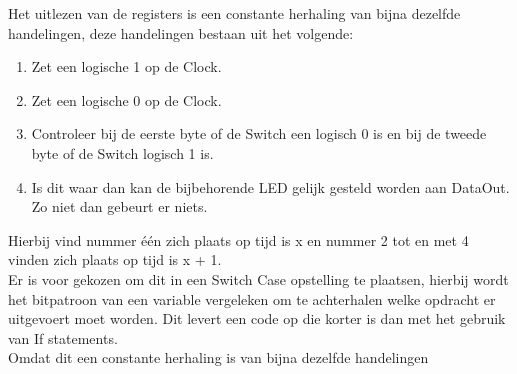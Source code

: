 Het uitlezen van de registers is een constante herhaling van bijna dezelfde handelingen, deze handelingen bestaan uit het volgende:
\begin{enumerate}
	\item Zet een logische 1 op de Clock.
	\item Zet een logische 0 op de Clock. 
	\item Controleer bij de eerste byte of de Switch een logisch 0 is en bij de tweede byte of de Switch logisch 1 is.
	\item Is dit waar dan kan de bijbehorende LED gelijk gesteld worden aan DataOut.
	Zo niet dan gebeurt er niets.
\end{enumerate}
Hierbij vind nummer één zich plaats op tijd is x en nummer 2 tot en met 4 vinden zich plaats op tijd is x + 1.\\

Er is voor gekozen om dit in een Switch Case opstelling te plaatsen, hierbij wordt het bitpatroon van een variable vergeleken om te achterhalen welke opdracht er uitgevoert moet worden. Dit levert een code op die korter is dan met het gebruik van If statements.\\


Omdat dit een constante herhaling is van bijna dezelfde handelingen 